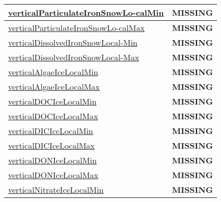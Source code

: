 {\begin{center}
\begin{longtable}{| p{2.0in} | p{4.0in} |}
    \hyperref[subsec:var_sec_tracer_monotonicity_verticalParticulateIronSnowLocalMin]{verticalParticulateIronSnowLo-}\hyperref[subsec:var_sec_tracer_monotonicity_verticalParticulateIronSnowLocalMin]{calMin  }& {\bf \color{red} MISSING} \\
    \hline
    \hyperref[subsec:var_sec_tracer_monotonicity_verticalParticulateIronSnowLocalMax]{verticalParticulateIronSnowLo-}\hyperref[subsec:var_sec_tracer_monotonicity_verticalParticulateIronSnowLocalMax]{calMax  }& {\bf \color{red} MISSING} \\
    \hline
    \hyperref[subsec:var_sec_tracer_monotonicity_verticalDissolvedIronSnowLocalMin]{verticalDissolvedIronSnowLocal-}\hyperref[subsec:var_sec_tracer_monotonicity_verticalDissolvedIronSnowLocalMin]{Min  }& {\bf \color{red} MISSING} \\
    \hline
    \hyperref[subsec:var_sec_tracer_monotonicity_verticalDissolvedIronSnowLocalMax]{verticalDissolvedIronSnowLocal-}\hyperref[subsec:var_sec_tracer_monotonicity_verticalDissolvedIronSnowLocalMax]{Max  }& {\bf \color{red} MISSING} \\
    \hline
    \hyperref[subsec:var_sec_tracer_monotonicity_verticalAlgaeIceLocalMin]{verticalAlgaeIceLocalMin} & {\bf \color{red} MISSING} \\
    \hline
    \hyperref[subsec:var_sec_tracer_monotonicity_verticalAlgaeIceLocalMax]{verticalAlgaeIceLocalMax} & {\bf \color{red} MISSING} \\
    \hline
    \hyperref[subsec:var_sec_tracer_monotonicity_verticalDOCIceLocalMin]{verticalDOCIceLocalMin} & {\bf \color{red} MISSING} \\
    \hline
    \hyperref[subsec:var_sec_tracer_monotonicity_verticalDOCIceLocalMax]{verticalDOCIceLocalMax} & {\bf \color{red} MISSING} \\
    \hline
    \hyperref[subsec:var_sec_tracer_monotonicity_verticalDICIceLocalMin]{verticalDICIceLocalMin} & {\bf \color{red} MISSING} \\
    \hline
    \hyperref[subsec:var_sec_tracer_monotonicity_verticalDICIceLocalMax]{verticalDICIceLocalMax} & {\bf \color{red} MISSING} \\
    \hline
    \hyperref[subsec:var_sec_tracer_monotonicity_verticalDONIceLocalMin]{verticalDONIceLocalMin} & {\bf \color{red} MISSING} \\
    \hline
    \hyperref[subsec:var_sec_tracer_monotonicity_verticalDONIceLocalMax]{verticalDONIceLocalMax} & {\bf \color{red} MISSING} \\
    \hline
    \hyperref[subsec:var_sec_tracer_monotonicity_verticalNitrateIceLocalMin]{verticalNitrateIceLocalMin} & {\bf \color{red} MISSING} \\

\end{longtable}
\end{center}}
